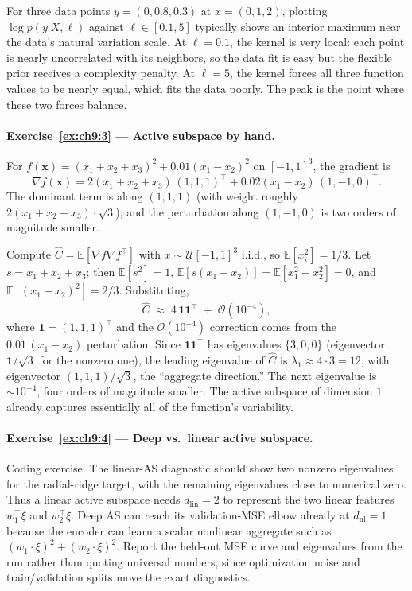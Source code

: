 \documentclass[11pt,a4paper]{report}
\begin{document}
For three data points $y = (0, 0.8, 0.3)$ at $x = (0, 1, 2)$, plotting $\log p(y | X, \ell)$ against $\ell \in [0.1, 5]$ typically shows an interior maximum near the data's natural variation scale.  At $\ell = 0.1$, the kernel is very local: each point is nearly uncorrelated with its neighbors, so the data fit is easy but the flexible prior receives a complexity penalty.  At $\ell = 5$, the kernel forces all three function values to be nearly equal, which fits the data poorly.  The peak is the point where these two forces balance.

\paragraph{Exercise~\ref{ex:ch9:3} --- Active subspace by hand.}
For $f(\bm x) = (x_1 + x_2 + x_3)^2 + 0.01(x_1 - x_2)^2$ on $[-1,1]^3$, the gradient is
\[
   \nabla f(\bm x) = 2(x_1 + x_2 + x_3)\,(1, 1, 1)^\top + 0.02(x_1 - x_2)\,(1, -1, 0)^\top.
\]
The dominant term is along $(1,1,1)$ (with weight roughly $2(x_1+x_2+x_3) \cdot \sqrt{3}$), and the perturbation along $(1,-1,0)$ is two orders of magnitude smaller.

Compute $\hat C = \mathbb{E}[\nabla f \nabla f^\top]$ with $x \sim \mathcal{U}[-1,1]^3$ i.i.d., so $\mathbb{E}[x_i^2] = 1/3$.  Let $s = x_1 + x_2 + x_3$; then $\mathbb{E}[s^2] = 1$, $\mathbb{E}[s(x_1 - x_2)] = \mathbb{E}[x_1^2 - x_2^2] = 0$, and $\mathbb{E}[(x_1 - x_2)^2] = 2/3$.  Substituting,
\[
   \hat C \;\approx\; 4\,\mathbf{1}\mathbf{1}^\top \;+\; \mathcal{O}(10^{-4}),
\]
where $\mathbf{1} = (1,1,1)^\top$ and the $\mathcal{O}(10^{-4})$ correction comes from the $0.01\,(x_1 - x_2)$ perturbation.  Since $\mathbf{1}\mathbf{1}^\top$ has eigenvalues $\{3, 0, 0\}$ (eigenvector $\mathbf{1}/\sqrt 3$ for the nonzero one), the leading eigenvalue of $\hat C$ is $\lambda_1 \approx 4 \cdot 3 = 12$, with eigenvector $(1,1,1)/\sqrt{3}$, the ``aggregate direction.''  The next eigenvalue is $\sim 10^{-4}$, four orders of magnitude smaller.  The active subspace of dimension $1$ already captures essentially all of the function's variability.

\paragraph{Exercise~\ref{ex:ch9:4} --- Deep vs.\ linear active subspace.}
Coding exercise.  The linear-AS diagnostic should show two nonzero eigenvalues for the radial-ridge target, with the remaining eigenvalues close to numerical zero.  Thus a linear active subspace needs $d_{\mathrm{lin}}=2$ to represent the two linear features $w_1^\top\xi$ and $w_2^\top\xi$.  Deep AS can reach its validation-MSE elbow already at $d_{\mathrm{nl}}=1$ because the encoder can learn a scalar nonlinear aggregate such as $(w_1\cdot\xi)^2 + (w_2\cdot\xi)^2$.  Report the held-out MSE curve and eigenvalues from the run rather than quoting universal numbers, since optimization noise and train/validation splits move the exact diagnostics.
\end{document}
